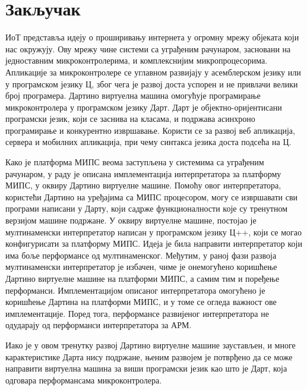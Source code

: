 \documentclass[12pt,oneside]{memoir}
\begin{document}
\chapter{Закључак}

ИоТ представља идеју о проширивању интернета у огромну мрежу објеката који нас окружују. Ову мрежу чине системи са уграђеним рачунаром, засновани на једноставним микроконтролерима, и комплекснијим микропроцесорима. Апликације за микроконтролере се углавном развијају у асемблерском језику или у програмском језику Ц, због чега је развој доста успорен и не привлачи велики број програмера. Дартино виртуелна машина омогућује програмирање микроконтролера у програмском језику Дарт. Дарт је објектно-оријентисани програмски језик, који се заснива на класама, и подржава асинхроно програмирање и конкурентно извршавање. Користи се за развој веб апликација, сервера и мобилних апликација, при чему синтакса језика доста подсећа на Ц. 

Како је платформа МИПС веома заступљена у системима са уграђеним рачунаром, у раду је описана имплементација интерпретатора за платформу МИПС, у оквиру Дартино виртуелне машине. Помоћу овог интерпретатора, користећи Дартино на уређајима са МИПС процесором, могу се извршавати сви програми написани у Дарту, који садрже функционалности које су тренутном верзијом машине подржане. У оквиру виртуелне машине, постојао је мултинаменски интерпретатор написан у програмском језику Ц++, који се могао конфигурисати за платформу МИПС. Идеја је била направити интерпретатор који има боље перформансе од мултинаменског. Међутим, у раној фази развоја мултинаменски интерпретатор је избачен, чиме је онемогућено коришћење Дартино виртуелне машине на платформи МИПС, а самим тим и поређење перформанси. Имплементацијом описаног интерпретатора омогућено је коришћење Дартина на платформи МИПС, и у томе се огледа важност ове имплементације. Поред тога, перформансе развијеног интерпретатора не одударају од перформанси интерпретатора за АРМ.

Иако је у овом тренутку развој Дартино виртуелне машине заустављен, и многе карактеристике Дарта нису подржане, њеним развојем је потврђено да се може направити виртуелна машина за виши програмски језик као што је Дарт, која одговара перформансама микроконтролера. 



\literatura

\backmatter


\end{document}
